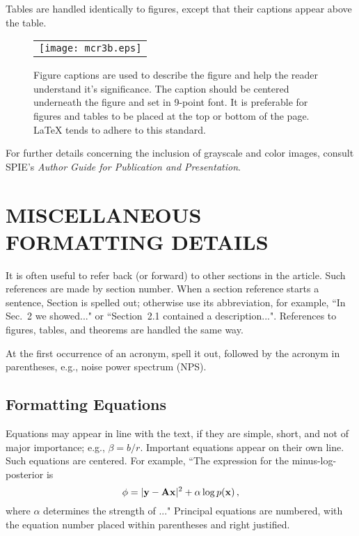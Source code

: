 \documentclass[]{spie}  %
\begin{document}
Tables are handled identically to figures, except that their captions appear above the table. 
   \begin{figure}
   \begin{center}
   \begin{tabular}{c}
   \texttt{[image: mcr3b.eps]}
   \end{tabular}
   \end{center}
   \caption[example] 
   { \label{fig:example} 
Figure captions are used to describe the figure and help the reader understand it's significance.  The caption should be centered underneath the figure and set in 9-point font.  It is preferable for figures and tables to be placed at the top or bottom of the page. LaTeX tends to adhere to this standard.}
   \end{figure} 

For further details concerning the inclusion of grayscale and color images, consult SPIE's {\it Author Guide for Publication and Presentation}.

\appendix    %
\section{MISCELLANEOUS FORMATTING DETAILS} \label{sec:misc}

It is often useful to refer back (or forward) to other sections in the article.  Such references are made by section number.  When a section reference starts a sentence, Section is spelled out; otherwise use its abbreviation, for example, ``In Sec.~2 we showed..." or ``Section~2.1 contained a description...".  References to figures, tables, and theorems are handled the same way.

At the first occurrence of an acronym, spell it out, followed by the acronym in parentheses, e.g., noise power spectrum (NPS).  

\subsection{Formatting Equations} 
Equations may appear in line with the text, if they are simple, short, and not of major importance; e.g., $\beta = b/r$.  Important equations appear on their own line.  Such equations are centered.  For example, ``The expression for the minus-log-posterior is
	\begin{equation}
	\label{eq:alpha}
\phi = |{\rm\bf y} - {\rm\bf A}{\rm\bf x}|^2 + \alpha \log p({\rm\bf x}) \, ,
	\end{equation}
where $\alpha$ determines the strength of ..."  Principal equations are numbered, with the equation number placed within parentheses and right justified.  
\end{document}
